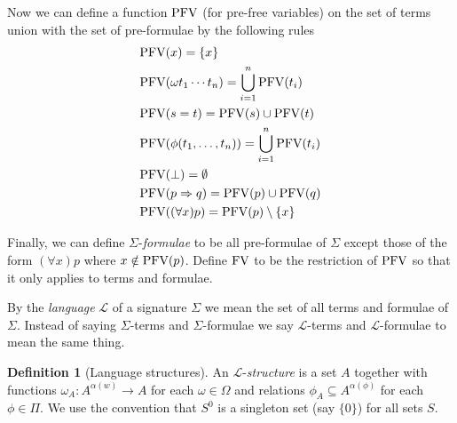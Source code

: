 \documentclass{report}
\theoremstyle{definition}
\theoremstyle{plain}
\theoremstyle{definition}
\newtheorem{defn}[thm]{Definition}
\begin{document}
	Now we can define a function $\textnormal{PFV}$ (for pre-free variables) on the set of terms union with the set of pre-formulae by the following rules
	\begin{align*}
		&\textnormal{PFV}(x) = \{x\}\\
		&\textnormal{PFV}(\omega t_1 \cdots t_n) = \bigcup_{i = 1}^{n}\textnormal{PFV}(t_i)\\
		&\textnormal{PFV}(s=t) = \textnormal{PFV}(s) \cup \textnormal{PFV}(t)\\
		&\textnormal{PFV}(\phi(t_1, \ldots, t_n)) = \bigcup_{i = 1}^{n}\textnormal{PFV}(t_i)\\
		&\textnormal{PFV}(\bot) = \emptyset\\
		&\textnormal{PFV}(p \Rightarrow q) = \textnormal{PFV}(p) \cup \textnormal{PFV}(q)\\
		&\textnormal{PFV}((\forall x)p) = \textnormal{PFV}(p)\setminus\{x\} 
	\end{align*}
	
	Finally, we can define $\Sigma$-\emph{formulae} to be all pre-formulae of $\Sigma$ except those of the form $(\forall x)p$ where $x\notin \textnormal{PFV}(p)$. Define $\textnormal{FV}$ to be the restriction of $\textnormal{PFV}$ so that it only applies to terms and formulae.
	
	By the \emph{language} $\mathcal{L}$ of a signature $\Sigma$ we mean the set of all terms and formulae of $\Sigma$. Instead of saying $\Sigma$-terms and $\Sigma$-formulae we say $\mathcal{L}$-terms and  $\mathcal{L}$-formulae to mean the same thing.
	\begin{defn}[Language structures]
		An $\mathcal{L}$-\emph{structure} is a set $A$ together with functions $\omega_A\colon A^{\alpha(w)} \to A$ for each $\omega \in \Omega$ and relations $\phi_A\subseteq A^{\alpha(\phi)}$ for each $\phi \in \Pi$. We use the convention that $S^0$ is a singleton set (say $\{0\}$) for all sets $S$.
	\end{defn}
\end{document}
